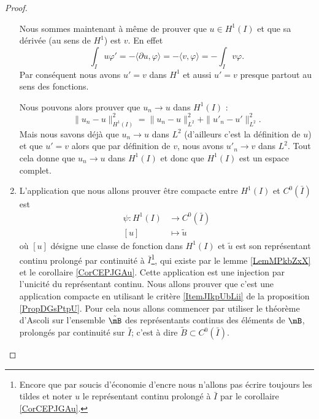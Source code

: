 \begin{proof}
\begin{enumerate}
            Nous sommes maintenant à même de prouver que \( u\in H^1(I)\) et que sa dérivée (au sens de \( H^1\)) est \( v\). En effet
            \begin{equation}
                \int_Iu\varphi'=-\langle \partial u, \varphi\rangle =-\langle v, \varphi\rangle =-\int_Iv\varphi.
            \end{equation}
            Par conséquent nous avons \( u'=v\) dans \( H^1\) et aussi \( u'=v\) presque partout au sens des fonctions.

            Nous pouvons alors prouver que \( u_n\to u\) dans \( H^1(I)\) :
            \begin{equation}
                \| u_n-u \|^2_{H^1(I)}=\| u_n-u \|^2_{L^2}+\| u'_n-u' \|_{L^2}^2.
            \end{equation}
            Mais nous savons déjà que \( u_n\to u\) dans \( L^2\) (d'ailleurs c'est la définition de \( u\)) et que \( u'=v\) alors que par définition de \( v\), nous avons \( u'_n\to v\) dans \( L^2\). Tout cela donne que \( u_n\to u\) dans \( H^1(I)\) et donc que \( H^1(I)\) est un espace complet.

        \item

            L'application que nous allons prouver être compacte entre \( H^1(I)\) et \( C^0(\bar I)\) est
            \begin{equation}
                \begin{aligned}
                    \psi\colon H^1(I)&\to C^0(\bar I) \\
                    [u]&\mapsto \tilde u 
                \end{aligned}
            \end{equation}
            où \( [u]\) désigne une classe de fonction dans \( H^1(I)\) et \( \tilde u\) est son représentant continu prolongé par continuité à \( \bar I\)\footnote{Encore que par soucis d'économie d'encre nous n'allons pas écrire toujours les tildes et noter \( u\) le représentant continu prolongé à \( \bar I\) par le corollaire \ref{CorCEPJGAu}.}, qui existe par le lemme \ref{LemMPkbZxX} et le corollaire \ref{CorCEPJGAu}. Cette application est une injection par l'unicité du représentant continu. Nous allons prouver que c'est une application compacte en utilisant le critère \ref{ItemJIkpUbLii} de la proposition \ref{PropDGsPtpU}. Pour cela nous allons commencer par utiliser le théorème d'Ascoli sur l'ensemble \( \tilde \mB\) des représentants continus des éléments de \( \mB\), prolongés par continuité sur \( \bar I\); c'est à dire \( \tilde B\subset C^0(\bar I)\).


\end{enumerate}
\end{proof}
